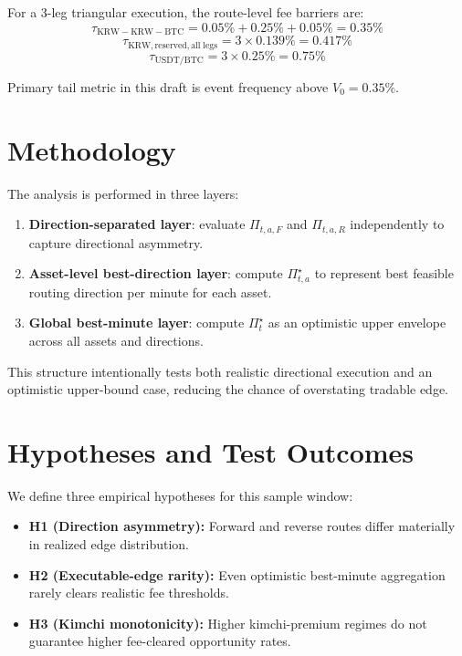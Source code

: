 \documentclass[11pt,a4paper]{article}
\begin{document}
For a 3-leg triangular execution, the route-level fee barriers are:
\begin{equation}
\tau_{\mathrm{KRW-KRW-BTC}} = 0.05\% + 0.25\% + 0.05\% = 0.35\%
\end{equation}
\begin{equation}
\tau_{\mathrm{KRW,reserved,all\;legs}} = 3 \times 0.139\% = 0.417\%
\end{equation}
\begin{equation}
\tau_{\mathrm{USDT/BTC}} = 3 \times 0.25\% = 0.75\%
\end{equation}

Primary tail metric in this draft is event frequency above $V_0=0.35\%$.

\section{Methodology}
The analysis is performed in three layers:
\begin{enumerate}
    \item \textbf{Direction-separated layer}: evaluate $\Pi_{t,a,F}$ and $\Pi_{t,a,R}$ independently to capture directional asymmetry.
    \item \textbf{Asset-level best-direction layer}: compute $\Pi^\star_{t,a}$ to represent best feasible routing direction per minute for each asset.
    \item \textbf{Global best-minute layer}: compute $\Pi^\star_t$ as an optimistic upper envelope across all assets and directions.
\end{enumerate}
This structure intentionally tests both realistic directional execution and an optimistic upper-bound case, reducing the chance of overstating tradable edge.

\section{Hypotheses and Test Outcomes}
We define three empirical hypotheses for this sample window:
\begin{itemize}
    \item \textbf{H1 (Direction asymmetry):} Forward and reverse routes differ materially in realized edge distribution.
    \item \textbf{H2 (Executable-edge rarity):} Even optimistic best-minute aggregation rarely clears realistic fee thresholds.
    \item \textbf{H3 (Kimchi monotonicity):} Higher kimchi-premium regimes do not guarantee higher fee-cleared opportunity rates.
\end{itemize}
\end{document}
